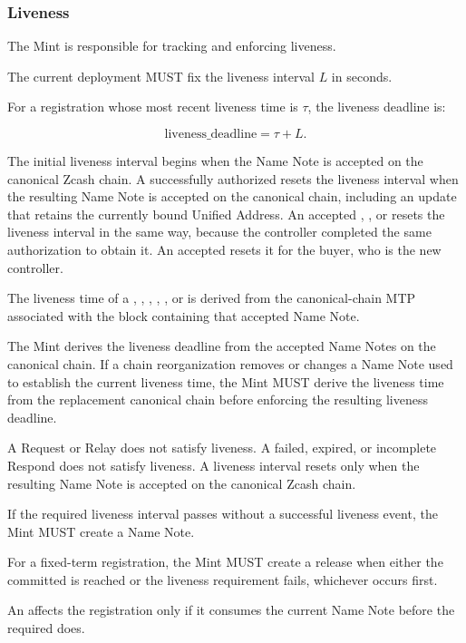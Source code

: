 \subsubsection{Liveness}

The Mint is responsible for tracking and enforcing liveness.

The current \zns{} deployment MUST fix the liveness interval $L$ in seconds.

For a registration whose most recent liveness time is $\tau$, the liveness deadline is:

$$\text{liveness\_deadline} = \tau + L.$$

The initial liveness interval begins when the  Name Note is accepted on the canonical Zcash chain. A successfully authorized  resets the liveness interval when the resulting Name Note is accepted on the canonical chain, including an update that retains the currently bound Unified Address. An accepted , , or  resets the liveness interval in the same way, because the controller completed the same authorization to obtain it. An accepted  resets it for the buyer, who is the new controller.

The liveness time of a , , , , , or  is derived from the canonical-chain MTP associated with the block containing that accepted Name Note.

The Mint derives the liveness deadline from the accepted Name Notes on the canonical chain. If a chain reorganization removes or changes a Name Note used to establish the current liveness time, the Mint MUST derive the liveness time from the replacement canonical chain before enforcing the resulting liveness deadline.

A Request or Relay does not satisfy liveness. A failed, expired, or incomplete Respond does not satisfy liveness. A liveness interval resets only when the resulting Name Note is accepted on the canonical Zcash chain.

If the required liveness interval passes without a successful liveness event, the Mint MUST create a  Name Note.

For a fixed-term registration, the Mint MUST create a release when either the committed  is reached or the liveness requirement fails, whichever occurs first.

An  affects the registration only if it consumes the current Name Note before the required  does.

